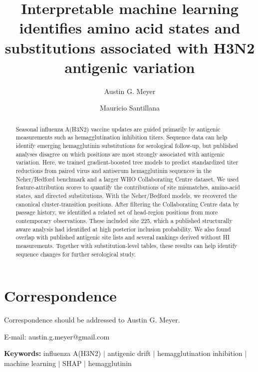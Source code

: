 \documentclass[12pt]{article}
\newcommand{\keywords}[1]{\par\noindent\textbf{Keywords:} #1\par}
\newcommand{\sectionstatement}[2]{%
  \section*{#1}
  #2
}
\begin{document}
\title{Interpretable machine learning identifies amino acid states and substitutions associated with H3N2 antigenic variation}

\author[1,2]{Austin G. Meyer}
\author[3]{Mauricio Santillana}


\date{}

\maketitle
\RaggedRight

\sectionstatement{Correspondence}{Correspondence should be addressed to Austin G. Meyer.\par\noindent E-mail: austin.g.meyer@gmail.com}

\clearpage
\begin{abstract}
\RaggedRight
Seasonal influenza A(H3N2) vaccine updates are guided primarily by antigenic measurements such as hemagglutination inhibition titers. Sequence data can help identify emerging hemagglutinin substitutions for serological follow-up, but published analyses disagree on which positions are most strongly associated with antigenic variation. Here, we trained gradient-boosted tree models to predict standardized titer reductions from paired virus and antiserum hemagglutinin sequences in the Neher/Bedford benchmark and a larger WHO Collaborating Centre dataset. We used feature-attribution scores to quantify the contributions of site mismatches, amino-acid states, and directed substitutions. With the Neher/Bedford models, we recovered the canonical cluster-transition positions. After filtering the Collaborating Centre data by passage history, we identified a related set of head-region positions from more contemporary observations. These included site 225, which a published structurally aware analysis had identified at high posterior inclusion probability. We also found overlap with published antigenic site lists and several rankings derived without HI measurements. Together with substitution-level tables, these results can help identify sequence changes for further serological study.
\end{abstract}

\keywords{influenza A(H3N2) $|$ antigenic drift $|$ hemagglutination inhibition $|$ machine learning $|$ SHAP $|$ hemagglutinin}
\end{document}
